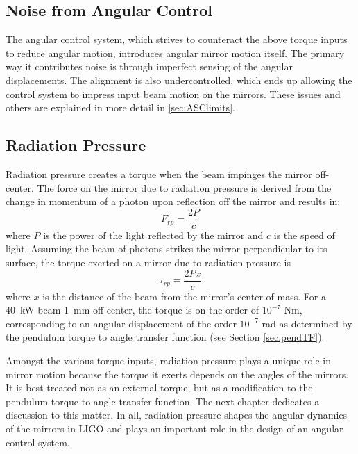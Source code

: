 

\subsection{Noise from Angular Control}
The angular control system, which strives to counteract the above torque inputs to reduce angular motion, introduces angular mirror motion itself. The primary way it contributes noise is through imperfect sensing of the angular displacements. The alignment is also undercontrolled, which ends up allowing the control system to impress input beam motion on the mirrors. These issues and others are explained in more detail in \ref{sec:ASClimits}.


\subsection{Radiation Pressure} 
\label{sec:rp_intro}
Radiation pressure creates a torque when the beam impinges the mirror
off-center. The force on the mirror due to radiation pressure is
derived from the change in momentum of a photon upon reflection off
the mirror and results in:
\begin{equation}
F_{rp} = \frac{2 P} {c}
\end{equation}
where $P$ is the power of the light reflected by the mirror and $c$ is the
speed of light. Assuming the beam of photons strikes the mirror
perpendicular to its surface, the torque exerted on a mirror due to
radiation pressure is
\begin{equation}
\tau_{rp} = \frac{2 P x} {c}
\label{eq:tau_rp}
\end{equation}
where $x$ is the distance of the beam from the mirror's center of mass. For a 40~kW beam 1~mm off-center, the torque is on the order of $10^{-7}$ Nm, corresponding to an angular displacement of the order $10^{-7}$ rad as determined by the pendulum torque to angle transfer function (see Section \ref{sec:pendTF}).

Amongst the various torque inputs, radiation pressure plays a unique role in mirror motion because the torque it exerts depends on the angles of the mirrors. 
It is best treated not as an external torque, but as a modification to the pendulum torque to angle transfer function. The next chapter dedicates a discussion to this matter. In all, radiation pressure shapes the angular dynamics of the mirrors in LIGO and plays an important role in the design of an angular control system.






